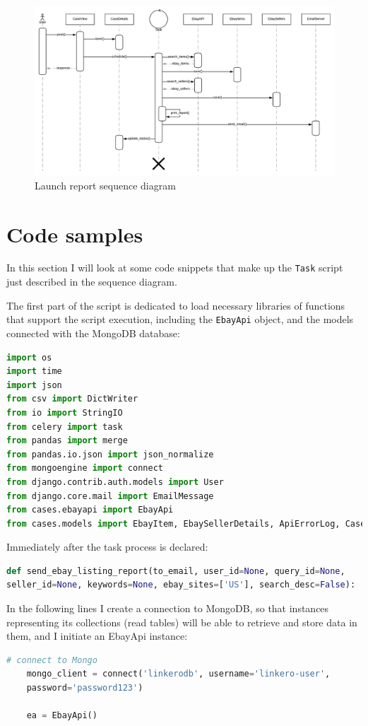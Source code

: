 \begin{figure}[H]
\centering
\includegraphics[angle=90, scale=0.6]{imgs/SequenceDiagram.pdf}
\caption{Launch report sequence diagram}
\label{fig:sqncdiag}
\end{figure}

\section{Code samples}
In this section I will look at some code snippets that make up the
\texttt{Task} script just described in the sequence diagram.

The first part of the script is dedicated to load necessary libraries of
functions that support the script execution, including the \texttt{EbayApi}
object, and the models connected with the MongoDB database:
\begin{lstlisting}[language=Python, breaklines=true]
import os
import time
import json
from csv import DictWriter
from io import StringIO
from celery import task
from pandas import merge
from pandas.io.json import json_normalize
from mongoengine import connect
from django.contrib.auth.models import User
from django.core.mail import EmailMessage
from cases.ebayapi import EbayApi
from cases.models import EbayItem, EbaySellerDetails, ApiErrorLog, CaseDetails
\end{lstlisting}

Immediately after the task process is declared:
\begin{lstlisting}[language=Python, breaklines=true]
def send_ebay_listing_report(to_email, user_id=None, query_id=None,
seller_id=None, keywords=None, ebay_sites=['US'], search_desc=False):
\end{lstlisting}

In the following lines I create a connection to MongoDB, so that instances
representing its collections (read tables) will be able to retrieve and store
data in them, and I initiate an EbayApi instance:
\begin{lstlisting}[language=Python, breaklines=true]
    # connect to Mongo
    mongo_client = connect('linkerodb', username='linkero-user',
    password='password123')
        
    ea = EbayApi()
\end{lstlisting}

